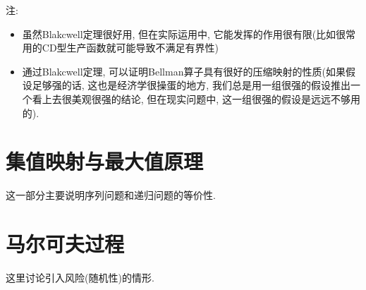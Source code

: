 注:
\begin{itemize}
    \item 虽然Blakcwell定理很好用, 但在实际运用中, 它能发挥的作用很有限(比如很常用的CD型生产函数就可能导致不满足有界性)
    \item 通过Blakcwell定理, 可以证明Bellman算子具有很好的压缩映射的性质(如果假设足够强的话, 这也是经济学很操蛋的地方, 我们总是用一组很强的假设推出一个看上去很美观很强的结论, 但在现实问题中, 这一组很强的假设是远远不够用的).
\end{itemize}
\section{集值映射与最大值原理}
这一部分主要说明序列问题和递归问题的等价性.
\section{马尔可夫过程}
这里讨论引入风险(随机性)的情形.
